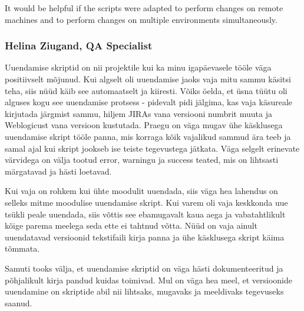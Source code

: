 \documentclass[12pt]{report}
\begin{document}
It would be helpful if the scripts were adapted to perform changes on remote machines and to perform changes on multiple environments simultaneously.

  \subsubsection{Helina Ziugand, QA Specialist}
  
  Uuendamise skriptid on nii projektile kui ka minu igapäevasele tööle väga positiivselt mõjunud. 
Kui algselt oli uuendamise jaoks vaja mitu sammu käsitsi teha, siis nüüd käib see automaatselt ja kiiresti. Võiks öelda, et üsna tüütu oli alguses kogu see uuendamise protsess - pidevalt pidi jälgima, kas vaja käsureale kirjutada järgmist sammu, hiljem JIRAs vana versiooni numbrit muuta ja Weblogicust vana versioon kustutada. Praegu on väga mugav ühe käsklusega uuendamise skript tööle panna, mis korraga kõik vajalikud sammud ära teeb ja samal ajal kui skript jookseb ise teiste tegevustega jätkata. Väga selgelt erinevate värvidega on välja tootud error, warningu ja success teated, mis on lihtsasti märgatavad ja hästi loetavad. 

Kui vaja on rohkem kui ühte moodulit uuendada, siis väga hea lahendus on selleks mitme moodulise uuendamise skript. Kui varem oli vaja keskkonda uue tsükli peale uuendada, siis võttis see ebamugavalt kaua aega ja vabatahtlikult kõige parema meelega seda ette ei tahtnud võtta. Nüüd on vaja ainult uuendatavad versioonid tekstifaili kirja panna ja ühe käsklusega skript käima tõmmata. 

Samuti tooks välja, et uuendamise skriptid on väga hästi dokumenteeritud ja põhjalikult kirja pandud kuidas toimivad. Mul on väga hea meel, et versioonide uuendamine on skriptide abil nii lihtsaks, mugavaks ja meeldivaks tegevuseks saanud.
\end{document}
